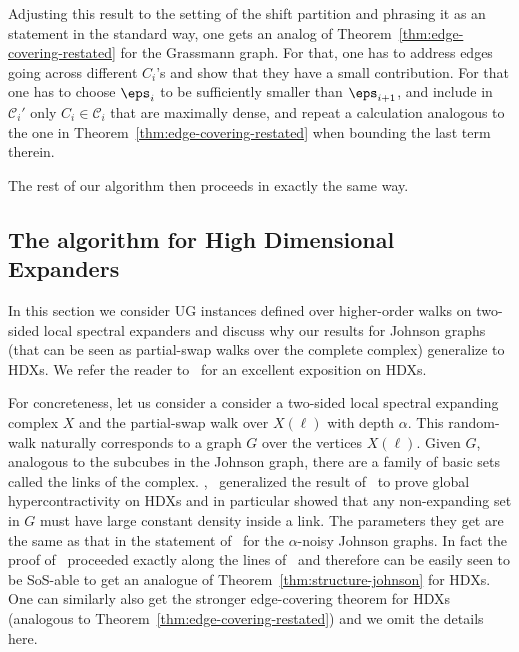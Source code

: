 Adjusting this result to the setting of the shift 
partition and phrasing it as an \sos statement 
in the standard way, one gets an analog of 
Theorem~\ref{thm:edge-covering-restated} for the 
Grassmann graph. For that, one has to address 
edges going across different $C_i$'s and 
show that they have a small contribution. 
For that one has to choose 
$\eps_{i}$ to be sufficiently smaller than 
$\eps_{i+1}$, and include in $\mathcal{C}_i'$ 
only $C_i\in\mathcal{C}_i$ that are maximally dense, and repeat a calculation analogous to the one in Theorem~\ref{thm:edge-covering-restated} when bounding the last term therein.

The rest of our algorithm then proceeds in exactly the same way.

\subsection{The algorithm for High Dimensional Expanders}\label{sec:ug-on-hdx}
In this section we consider UG instances defined over higher-order walks on two-sided local spectral expanders and discuss why our results for Johnson graphs (that can be seen as partial-swap walks over the complete complex) generalize to HDXs. We refer the reader to~\cite{dikstein2018boolean} for an excellent exposition on HDXs. 


For concreteness, let us consider a consider a two-sided local spectral expanding complex $X$ and the partial-swap walk over $X(\ell)$ with depth $\alpha$. This random-walk naturally corresponds to a graph $G$ over the vertices $X(\ell)$. Given $G$, analogous to the subcubes in the Johnson graph, there are a family of basic sets called the links of the complex. \cite{bafna2022hypercontractivity},~\cite{gur2022hypercontractivity} generalized the result of~\cite{KMMS} to prove global hypercontractivity on HDXs and in particular showed that any non-expanding set in $G$ must have large constant density inside a link. The parameters they get are the same as that in the statement of~\cite{KMMS} for the $\alpha$-noisy Johnson graphs. In fact the proof of~\cite{bafna2022hypercontractivity} proceeded exactly along the lines of~\cite{KMMS} and therefore can be easily seen to be SoS-able to get an analogue of Theorem~\ref{thm:structure-johnson} for HDXs. One can similarly also get the stronger edge-covering theorem for HDXs (analogous to Theorem~\ref{thm:edge-covering-restated}) and we omit the details here. 


